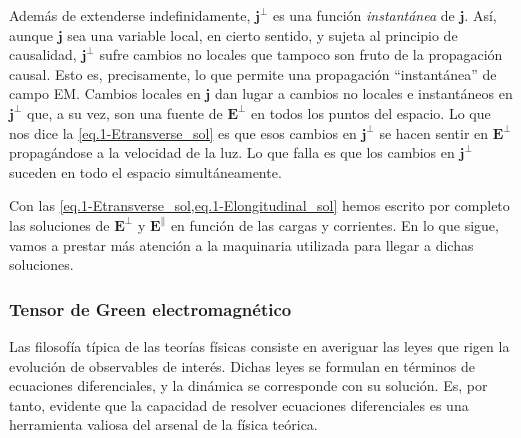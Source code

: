 \begin{observation}
    Además de extenderse indefinidamente, \(\mathbf{j}^\perp\) es una función \emph{instantánea} de \(\mathbf{j}\). Así, aunque \(\mathbf{j}\) sea una variable local, en cierto sentido, y sujeta al principio de causalidad, \(\mathbf{j}^\perp\) sufre cambios no locales que tampoco son fruto de la propagación causal. Esto es, precisamente, lo que permite una propagación ``instantánea'' de campo EM. Cambios locales en \(\mathbf{j}\) dan lugar a cambios no locales e instantáneos en \(\mathbf{j}^\perp\) que, a su vez, son una fuente de \(\mathbf{E}^\perp\) en todos los puntos del espacio. Lo que nos dice la \cref{eq.1-Etransverse_sol} es que esos cambios en \(\mathbf{j}^\perp\) se hacen sentir en \(\mathbf{E}^\perp\) propagándose a la velocidad de la luz. Lo que falla es que los cambios en \(\mathbf{j}^\perp\) suceden en todo el espacio simultáneamente.
\end{observation}

Con las \cref{eq.1-Etransverse_sol,eq.1-Elongitudinal_sol} hemos escrito por completo las soluciones de \(\mathbf{E}^\perp\) y \(\mathbf{E}^\parallel\) en función de las cargas y corrientes. En lo que sigue, vamos a prestar más atención a la maquinaria utilizada para llegar a dichas soluciones. 

\subsubsection{Tensor de Green electromagnético}
\label{subsubsec.1-tensorgreen0}

Las filosofía típica de las teorías físicas consiste en averiguar las leyes que rigen la evolución de observables de interés. Dichas leyes se formulan en términos de ecuaciones diferenciales, y la dinámica se corresponde con su solución. Es, por tanto, evidente que la capacidad de resolver ecuaciones diferenciales es una herramienta valiosa del arsenal de la física teórica. 

